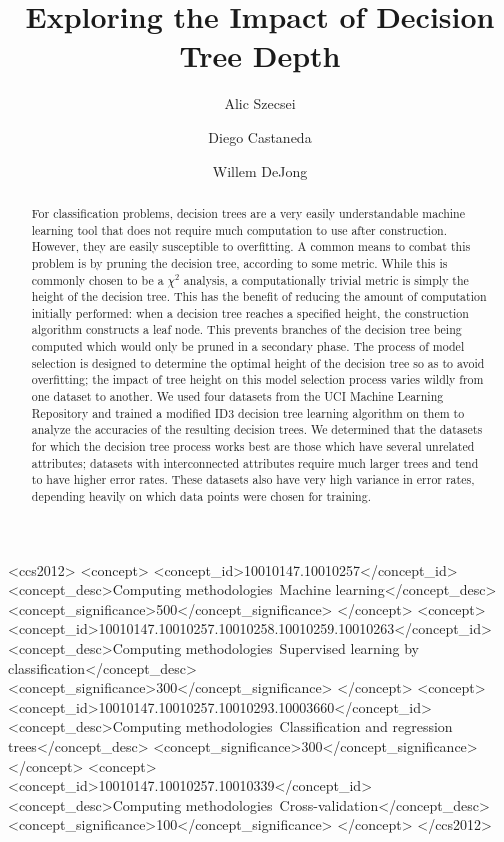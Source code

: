 \documentclass[screen, authorversion, nonacm, sigconf]{acmart}
\begin{document}
\title{Exploring the Impact of Decision Tree Depth}

\author{Alic Szecsei}

\author{Diego Castaneda}

\author{Willem DeJong}

\begin{abstract}
  For classification problems, decision trees are a very easily understandable machine learning tool that does not require much computation to use after construction. However, they are easily susceptible to overfitting. A common means to combat this problem is by pruning the decision tree, according to some metric. While this is commonly chosen to be a $\chi^2$ analysis, a computationally trivial metric is simply the height of the decision tree. This has the benefit of reducing the amount of computation initially performed: when a decision tree reaches a specified height, the construction algorithm constructs a leaf node. This prevents branches of the decision tree being computed which would only be pruned in a secondary phase. The process of model selection is designed to determine the optimal height of the decision tree so as to avoid overfitting; the impact of tree height on this model selection process varies wildly from one dataset to another. We used four datasets from the UCI Machine Learning Repository and trained a modified ID3 decision tree learning algorithm on them to analyze the accuracies of the resulting decision trees. We determined that the datasets for which the decision tree process works best are those which have several unrelated attributes; datasets with interconnected attributes require much larger trees and tend to have higher error rates. These datasets also have very high variance in error rates, depending heavily on which data points were chosen for training.
\end{abstract}

\begin{CCSXML}
  <ccs2012>
  <concept>
  <concept_id>10010147.10010257</concept_id>
  <concept_desc>Computing methodologies~Machine learning</concept_desc>
  <concept_significance>500</concept_significance>
  </concept>
  <concept>
  <concept_id>10010147.10010257.10010258.10010259.10010263</concept_id>
  <concept_desc>Computing methodologies~Supervised learning by classification</concept_desc>
  <concept_significance>300</concept_significance>
  </concept>
  <concept>
  <concept_id>10010147.10010257.10010293.10003660</concept_id>
  <concept_desc>Computing methodologies~Classification and regression trees</concept_desc>
  <concept_significance>300</concept_significance>
  </concept>
  <concept>
  <concept_id>10010147.10010257.10010339</concept_id>
  <concept_desc>Computing methodologies~Cross-validation</concept_desc>
  <concept_significance>100</concept_significance>
  </concept>
  </ccs2012>
\end{CCSXML}
\end{document}
